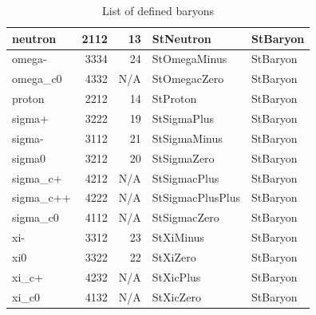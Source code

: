 \documentclass[twoside]{article}
\begin{document}
\begin{description}
\begin{table}[htb]
\begin{center}
\begin{tabular}{|l|r|r|l| l |}
       neutron  & 2112  & 13    &            StNeutron  & StBaryon       \\ \hline
        omega-  & 3334  & 24    &         StOmegaMinus  & StBaryon       \\ \hline
      omega\_c0  & 4332  & N/A   &         StOmegacZero  & StBaryon       \\ \hline
        proton  & 2212  & 14    &             StProton  & StBaryon       \\ \hline
        sigma+  & 3222  & 19    &          StSigmaPlus  & StBaryon       \\ \hline
        sigma-  & 3112  & 21    &         StSigmaMinus  & StBaryon       \\ \hline
        sigma0  & 3212  & 20    &          StSigmaZero  & StBaryon       \\ \hline
      sigma\_c+  & 4212  & N/A   &         StSigmacPlus  & StBaryon       \\ \hline
     sigma\_c++  & 4222  & N/A   &     StSigmacPlusPlus  & StBaryon       \\ \hline
      sigma\_c0  & 4112  & N/A   &         StSigmacZero  & StBaryon       \\ \hline
           xi-  & 3312  & 23    &            StXiMinus  & StBaryon       \\ \hline
           xi0  & 3322  & 22    &             StXiZero  & StBaryon       \\ \hline
         xi\_c+  & 4232  & N/A   &            StXicPlus  & StBaryon       \\ \hline
         xi\_c0  & 4132  & N/A   &            StXicZero  & StBaryon       \\ \hline
    \end{tabular}            
    \caption{List of defined baryons}
    \label{tab:baryons}
    \end{center}
\end{table}
\clearpage


\end{description}
\end{document}
